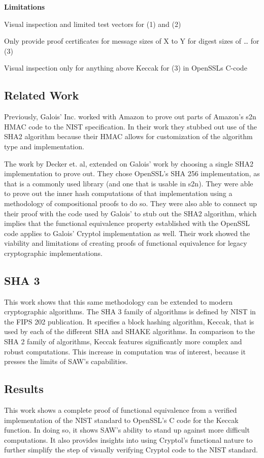 \noindent \textbf{Limitations}
\begin{compactitem}
  \item Visual inspection and limited test vectors for (1) and (2)
  \item Only provide proof certificates for message sizes of X to Y for digest sizes of … for (3)
  \item Visual inspection only for anything above Keccak for (3) in OpenSSLs C-code
\end{compactitem}

\subsection{Related Work}
  Previously, Galois’ Inc. worked with Amazon to prove out parts of Amazon’s s2n HMAC code to the NIST specification.  
In their work they stubbed out use of the SHA2 algorithm because their HMAC allows for customization of the algorithm type and implementation.

The work by Decker et. al, extended on Galois' work by choosing a single SHA2 implementation to prove out.  
They chose OpenSSL’s SHA 256 implementation, as that is a commonly used library (and one that is usable in s2n).  
They were able to prove out the inner hash computations of that implementation using a methodology of compositional proofs to do so.  
They were also able to connect up their proof with the code used by Galois’ to stub out the SHA2 algorithm, which implies that the functional equivalence property established with the OpenSSL code applies to Galois' Cryptol implementation as well.  
Their work showed the viability and limitations of creating proofs of functional equivalence for legacy cryptographic implementations.



\subsection{SHA 3}
This work shows that this same methodology can be extended to modern cryptographic algorithms.
The SHA 3 family of algorithms is defined by NIST in the FIPS 202 publication.
It specifies a block hashing algorithm, Keccak, that is used by each of the different SHA and SHAKE algorithms.
In comparison to the SHA 2 family of algorithms, Keccak features significantly more complex and robust computations.
This increase in computation was of interest, because it presses the limits of SAW's capabilities.

\subsection{Results}
This work shows a complete proof of functional equivalence from a verified implementation of the NIST standard to OpenSSL's C code for the Keccak function.
In doing so, it shows SAW's ability to stand up against more difficult computations.
It also provides insights into using Cryptol's functional nature to further simplify the step of visually verifying Cryptol code to the NIST standard.

